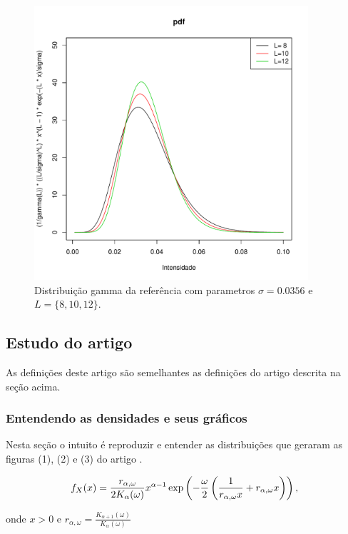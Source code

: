 \documentclass[12pt,a4paper]{article}
\begin{document}
\begin{figure}[!h]
\centering
\includegraphics[width=4.0in]{fig_1_anfinsen_2009.pdf}
	\caption{Distribuição gamma da referência \cite{anfinsen2009} com parametros $\sigma=0.0356$ e $L=\{8,10,12\}$.}
\label{fig3}
\end{figure}

\subsection{Estudo do artigo  \cite{freitas_frery_2005}}

As definições deste artigo são semelhantes as definições do artigo \cite{anfinsen2009} descrita na seção acima. 

\subsubsection{ Entendendo as densidades e seus gráficos}

Nesta seção o intuito é reproduzir e entender as distribuições que geraram as figuras (1), (2) e (3) do artigo \cite{freitas_frery_2005}. 

\begin{equation}\label{eqn99}
	f_{X}(x)=\frac{r_{\alpha,\omega}}{2K_{\alpha}(\omega)}x^{\alpha-1}\exp\left(-\frac{\omega}{2}\left(\frac{1}{r_{\alpha,\omega}x}+ r_{\alpha,\omega}x\right)\right), \\
\end{equation}

onde $x>0$  e $r_{\alpha,\omega}=\frac{K_{\alpha+1}(\omega)}{K_{\alpha}(\omega)}$
\end{document}
